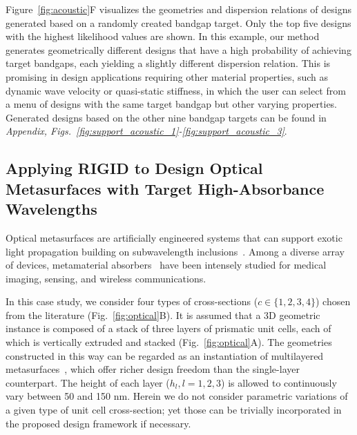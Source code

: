 \documentclass{article}
\begin{document}
Figure~\ref{fig:acoustic}F visualizes the geometries and dispersion relations of designs generated based on a randomly created bandgap target. Only the top five designs with the highest likelihood values are shown.
In this example, our method generates geometrically different designs that have a high probability of achieving target bandgaps, each yielding a slightly different dispersion relation. This is promising in design applications requiring other material properties, such as dynamic wave velocity or quasi-static stiffness, in which the user can select from a menu of designs with the same target bandgap but other varying properties. Generated designs based on the other nine bandgap targets can be found in \textit{Appendix, Figs.~\ref{fig:support_acoustic_1}-\ref{fig:support_acoustic_3}}.






\subsection{Applying RIGID to Design Optical Metasurfaces with Target High-Absorbance Wavelengths}
\label{sec:optical}

Optical metasurfaces are artificially engineered systems that can support exotic light propagation building on subwavelength inclusions~\cite{pendry2000negative, yu2011light, kildishev2013planar, cui2014coding, bukhari2019metasurfaces, hu2021review}. Among a diverse array of devices, metamaterial absorbers~\cite{landy2008perfect, liu2010infrared, hao2010high, watts2012metamaterial, cui2014plasmonic, liu2017experimental, lee2018complete} have been intensely studied for medical imaging, sensing, and wireless communications.

In this case study, we consider four types of cross-sections ($c \in \{1,2,3,4\}$) chosen from the literature (Fig.~\ref{fig:optical}B). It is assumed that a 3D geometric instance is composed of a stack of three layers of prismatic unit cells, each of which is vertically extruded and stacked (Fig.~\ref{fig:optical}A). The geometries constructed in this way can be regarded as an instantiation of multilayered metasurfaces~\cite{zhou2018multilayer, li2018wideband, marino2021harmonic, malek2022multifunctional, zhang2023high}, which offer richer design freedom than the single-layer counterpart. The height of each layer ($h_l, l=1, 2, 3$) is allowed to continuously vary between 50 and 150 nm. Herein we do not consider parametric variations of a given type of unit cell cross-section; yet those can be trivially incorporated in the proposed design framework if necessary.
\end{document}
